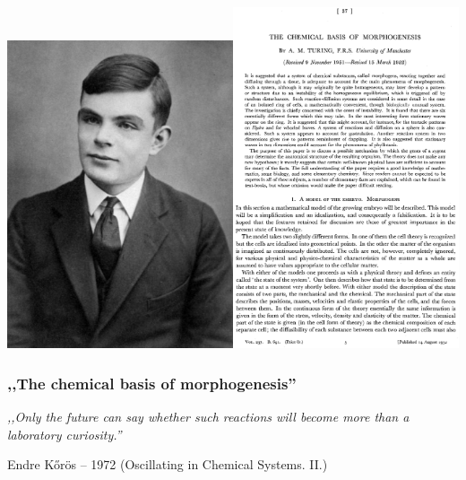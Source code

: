 \documentclass{beamer}
\begin{document}
\begin{frame}
	\centering
	\includegraphics[width=0.5\textwidth]{turing.jpg}\includegraphics[width=0.5\textwidth]{morpho.eps}

	\frametitle{,,The chemical basis of morphogenesis''}
\end{frame}

\begin{frame}
	\centering
	\emph{,,Only the future can say whether such reactions will become more than a laboratory curiosity.''}

\vspace{1cm}

Endre Kőrös -- 1972 (Oscillating in Chemical Systems. II.)
\end{frame}
\end{document}
